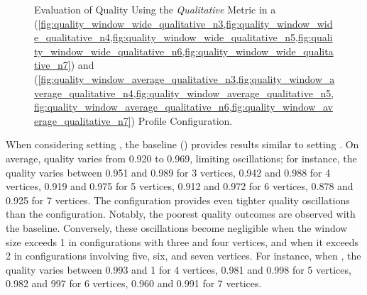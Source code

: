 \begin{figure}[H]
\begin{adjustbox}{minipage=\linewidth,scale=0.75}
    \caption{Evaluation of Quality Using the \emph{Qualitative} Metric in a \wide (\cref{fig:quality_window_wide_qualitative_n3,fig:quality_window_wide_qualitative_n4,fig:quality_window_wide_qualitative_n5,fig:quality_window_wide_qualitative_n6,fig:quality_window_wide_qualitative_n7}) and \average (\cref{fig:quality_window_average_qualitative_n3,fig:quality_window_average_qualitative_n4,fig:quality_window_average_qualitative_n5,fig:quality_window_average_qualitative_n6,fig:quality_window_average_qualitative_n7}) Profile Configuration.}  \label{fig:quality_window_qualitative}
  \end{adjustbox}
\end{figure}

When considering setting \average, the baseline () provides results similar to setting \wide. On average, quality varies from 0.920 to 0.969, limiting oscillations; for instance, the quality varies between 0.951 and 0.989 for 3 vertices, 0.942 and 0.988 for 4 vertices, 0.919 and 0.975 for 5 vertices, 0.912 and 0.972 for 6 vertices, 0.878 and 0.925 for 7 vertices. The \average configuration provides even tighter quality oscillations than the \wide configuration. Notably, the poorest quality outcomes are observed with the baseline. Conversely, these oscillations become negligible when the window size exceeds 1 in configurations with three and four vertices, and when it exceeds 2 in configurations involving five, six, and seven vertices.  For instance, when , the quality varies between  0.993 and 1 for 4 vertices, 0.981 and 0.998 for 5 vertices, 0.982 and 997 for 6 vertices, 0.960 and 0.991 for 7 vertices.

